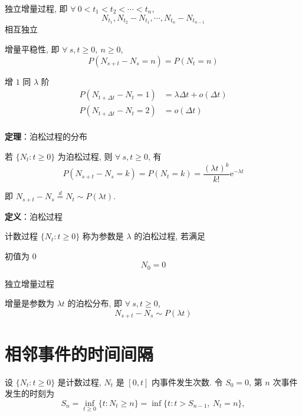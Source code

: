 \documentclass[openany]{ctexbook}
\theoremstyle{kaiti}
\theoremstyle{normal}
\begin{document}
 独立增量过程, 即 $\forall~0< t_1 < t_2< \cdots < t_n$, 
\begin{equation}
    N_{t_1},N_{t_2}-N_{t_1},\cdots,N_{t_n}-N_{t_{n-1}}
\end{equation} 相互独立
  

 增量平稳性, 即 $\forall~s,t\geqslant0,~n\geqslant0$, 
\begin{equation}
    P(N_{s+t}-N_s=n)=P(N_t=n)
\end{equation}
  

 增 $1$ 同 $\lambda$ 阶
\begin{equation}
    \begin{aligned}
      P(N_{t+\Delta t}-N_t=1)&=\lambda\Delta t+o(\Delta t)\\
      P(N_{t+\Delta t}-N_t=2)&=o(\Delta t)\\
    \end{aligned}
\end{equation}
  
\textbf{定理}：泊松过程的分布
  
  若 $\{N_t:t\geqslant0\}$ 为泊松过程, 则 $\forall~s,t\geqslant0$, 有
\begin{equation}
    P(N_{s+t}-N_s=k)=P(N_t=k)=\frac{(\lambda t)^k}{k!}\mathrm{e}^{-\lambda t}
\end{equation}
  
  即 $N_{s+t}-N_s\overset{d}{=}N_t\sim P(\lambda t)$.
  
\textbf{定义}：泊松过程
  
  计数过程 $\{N_t:t\geqslant0\}$ 称为参数是 $\lambda$ 的泊松过程, 若满足

 初值为 $0$
\begin{equation}
    N_0=0
\end{equation}
  

 独立增量过程

 增量是参数为 $\lambda t$ 的泊松分布, 即 $\forall~s,t\geqslant0$, 
\begin{equation}
    N_{s+t}-N_s\sim P(\lambda t)
\end{equation}
  
\section{相邻事件的时间间隔}
  
  设 $\{N_t:t\geqslant0\}$ 是计数过程, $N_t$ 是 $[0,t]$ 内事件发生次数. 令 $S_0=0$, 第 $n$ 次事件发生的时刻为
\begin{equation}
    S_n=\inf_{t\geqslant0}\{t:N_t\geqslant n\}=\inf\{t:t>S_{n-1},~N_t=n\},
\end{equation}
  
\end{document}
